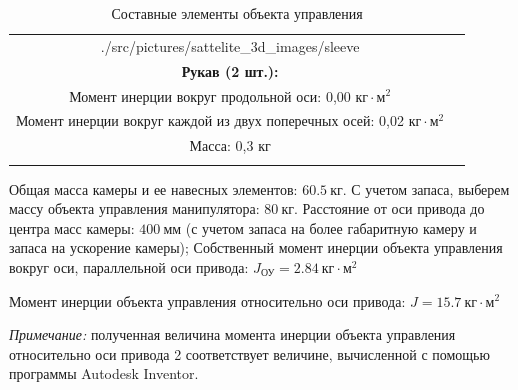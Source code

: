 \begin{table}[ht!]
\begin{tabular}{|c|c|}
                            {./src/pictures/sattelite_3d_images/sleeve} &
            \shortstack[l] {
                \rule{0pt}{2mm} \\
                \textbf{Рукав (2 шт.):} \\
                Момент инерции вокруг продольной оси: 0,00 $\text{кг} \cdot \text{м}^{2}$ \\
                Момент инерции вокруг каждой из двух поперечных  осей: 0,02 $\text{кг} \cdot \text{м}^{2}$ \\
                Масса: 0,3 кг \\
                \rule{0pt}{2mm}
            } \\
        \hline
    \end{tabular}

    \caption{Составные элементы объекта управления}
\end{table}

Общая масса камеры и ее навесных элементов: $60.5 ~\text{кг}$. С учетом запаса, выберем
массу объекта управления манипулятора: $80 ~\text{кг}$.
Расстояние от оси привода до центра масс камеры: $400 ~\text{мм}$ (с учетом запаса
на более габаритную камеру и запаса на ускорение камеры);
Собственный момент инерции объекта управления вокруг оси, параллельной оси привода:
$ J_{\text{ОУ}} = 2.84 ~\text{кг} \cdot \text{м}^2 $

Момент инерции объекта управления относительно оси привода:
$ J = 15.7 ~\text{кг} \cdot \text{м}^2 $

\textit{Примечание:} полученная величина момента инерции объекта управления относительно
оси привода 2 соответствует величине, вычисленной с помощью программы Autodesk Inventor.



\endinput

